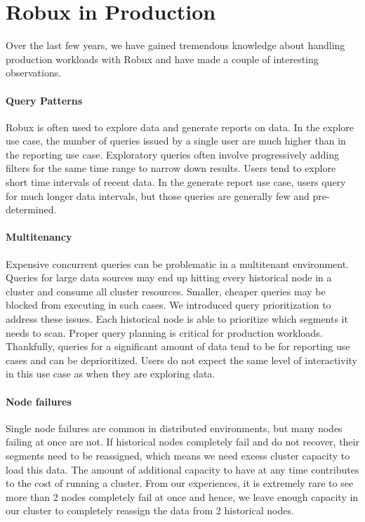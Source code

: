 \documentclass{sig-alternate-2013}
\begin{document}
\section{Robux in Production}\label{sec:production}
Over the last few years, we have gained tremendous knowledge about handling
production workloads with Robux and have made a couple of interesting observations.

\paragraph{Query Patterns}
Robux is often used to explore data and generate reports on data. In the
explore use case, the number of queries issued by a single user are much higher
than in the reporting use case. Exploratory queries often involve progressively
adding filters for the same time range to narrow down results. Users tend to
explore short time intervals of recent data. In the generate report use case,
users query for much longer data intervals, but those queries are generally few
and pre-determined.

\paragraph{Multitenancy}
Expensive concurrent queries can be problematic in a multitenant
environment. Queries for large data sources may end up hitting every historical
node in a cluster and consume all cluster resources. Smaller, cheaper queries
may be blocked from executing in such cases. We introduced query prioritization
to address these issues. Each historical node is able to prioritize which
segments it needs to scan. Proper query planning is critical for production
workloads. Thankfully, queries for a significant amount of data tend to be for
reporting use cases and can be deprioritized. Users do not expect the same level of
interactivity in this use case as when they are exploring data.

\paragraph{Node failures}
Single node failures are common in distributed environments, but many nodes
failing at once are not. If historical nodes completely fail and do not
recover, their segments need to be reassigned, which means we need excess cluster
capacity to load this data. The amount of additional capacity to have at any
time contributes to the cost of running a cluster. From our experiences, it is
extremely rare to see more than 2 nodes completely fail at once and hence, we
leave enough capacity in our cluster to completely reassign the data from 2
historical nodes.
\end{document}
